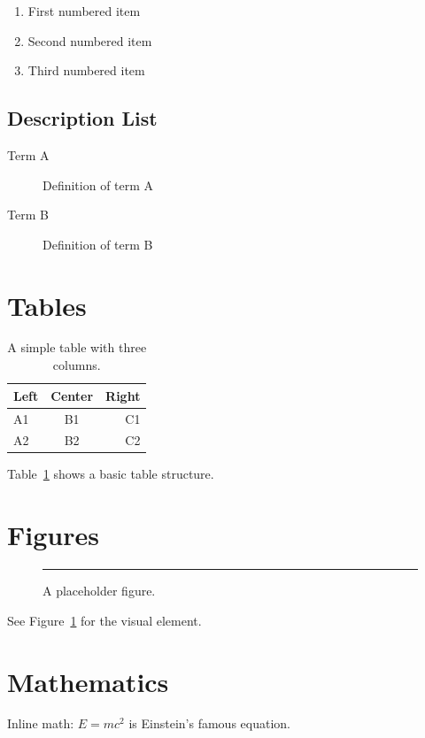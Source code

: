 \documentclass{article}
\begin{document}
\begin{enumerate}
\item First numbered item
\item Second numbered item
\item Third numbered item
\end{enumerate}

\subsection{Description List}

\begin{description}
\item[Term A] Definition of term A
\item[Term B] Definition of term B
\end{description}

\section{Tables}

\begin{table}[h]
\centering
\begin{tabular}{|l|c|r|}
\hline
Left & Center & Right \\
\hline
A1 & B1 & C1 \\
A2 & B2 & C2 \\
\hline
\end{tabular}
\caption{A simple table with three columns.}
\label{tab:simple}
\end{table}

Table~\ref{tab:simple} shows a basic table structure.

\section{Figures}

\begin{figure}[h]
\centering
\rule{4cm}{3cm}
\caption{A placeholder figure.}
\label{fig:placeholder}
\end{figure}

See Figure~\ref{fig:placeholder} for the visual element.

\section{Mathematics}

Inline math: $E = mc^2$ is Einstein's famous equation.
\end{document}
